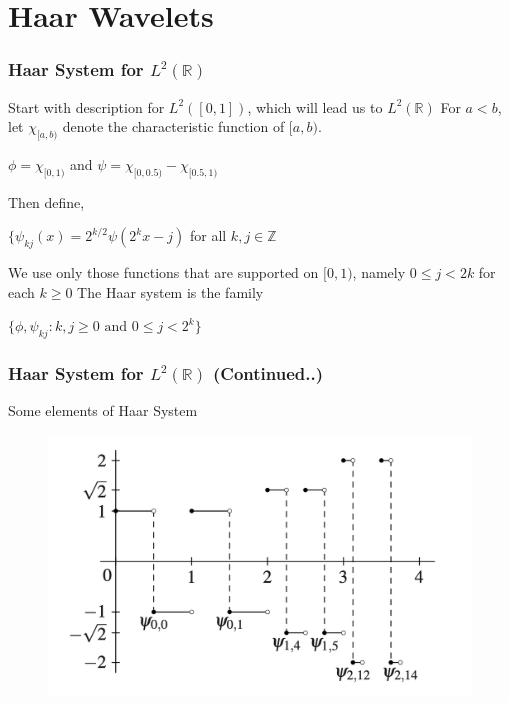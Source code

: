 \documentclass{beamer}
\begin{document}

\section{Haar Wavelets} %

\begin{frame}
\frametitle{Haar System for  $L^2\left({\mathbb{R}}\right)$ }
Start with description for $L^2([0,1])$, which will lead us to $L^2\left({\mathbb{R}}\right)$
\linebreak\linebreak
For $a < b$, let $\chi_{[a,b)}$ denote the characteristic function of $[a, b)$.

\begin{center}
        $\phi=\chi_{[0,1)}$ and $\psi = \chi_{[0, 0.5)} - \chi_{[0.5, 1)}$
    \end{center} 
Then define,
\begin{center}
    $\{\psi_{kj}(x) = 2^{k/2}\psi(2^kx-j)$ \space\space\space for all \space\space\space $k,j \in \mathbb{Z}$
\end{center} 

We use only those functions that are supported on $[0, 1)$, namely $0 \le j < 2k$ for each
$k \ge 0$
\linebreak\linebreak
The Haar system is the family

\begin{block}{}
    \begin{center}
        $\{\phi, \psi_{kj}:k,j\ge 0 \text{ and } 0 \le j < 2^k\}$
    \end{center}
\end{block}

\end{frame}

\begin{frame}
\frametitle{ Haar System for  $L^2\left({\mathbb{R}}\right)$ (Continued..)}
Some elements of Haar System
\begin{figure}
\includegraphics[width=0.8\linewidth]{haarsystem.jpg}
\end{figure}
\end{frame}
\end{document}
